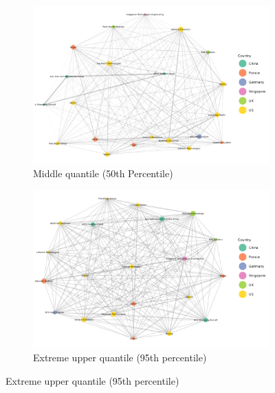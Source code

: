 \documentclass[
  letterpaper,
  DIV=11,
  numbers=noendperiod]{scrartcl}
\begin{document}
\begin{figure}

{\centering 

\begin{figure}[H]

{\centering \includegraphics[width=6.75in,height=\textheight]{plots/fig-vol50.png}

}

\caption{Middle quantile (50th Percentile)}

\end{figure}

\begin{figure}[H]

{\centering \includegraphics[width=6.75in,height=\textheight]{plots/fig-vol95.png}

}

\caption{Extreme upper quantile (95th percentile)}


\end{figure}}
\end{figure}
\end{document}

